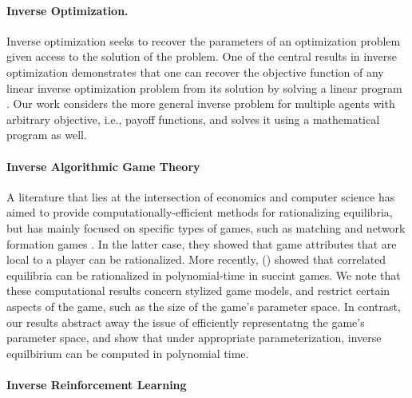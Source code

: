 \paragraph{Inverse Optimization.} 

Inverse optimization \cite{heuberger2004inverse,chan2021inverse} seeks to recover the parameters of an optimization problem given access to the solution of the problem. One of the central results in inverse optimization demonstrates that one can recover the objective function of any linear inverse optimization problem from its solution by solving a linear program \cite{chan2022inverse}.
Our work considers the more general inverse problem for multiple agents with arbitrary objective, i.e., payoff functions, and solves it using a mathematical program as well.


\paragraph{Inverse Algorithmic Game Theory}

A literature that lies at the intersection of economics and computer science has aimed to provide computationally-efficient methods for rationalizing equilibria, but has mainly focused on specific types of games, such as matching \cite{kalyanaraman2008complexisaac} and network formation games \cite{kalyanaraman2009complexfocs}.
In the latter case, they showed that game attributes that are local to a player can be rationalized.
More recently, \citeauthor{kuleshov2015inverse}
(\citeyear{kuleshov2015inverse}) showed that correlated equilibria can be rationalized in polynomial-time in succint games.
We note that these computational results concern stylized game models, and restrict certain aspects of the game, such as the size of the game's parameter space.
In contrast, our results abstract away the issue of efficiently representatng the game's parameter space, and show that under appropriate parameterization,
inverse equilbirium can be computed in polynomial time.


\paragraph{Inverse Reinforcement Learning} 

